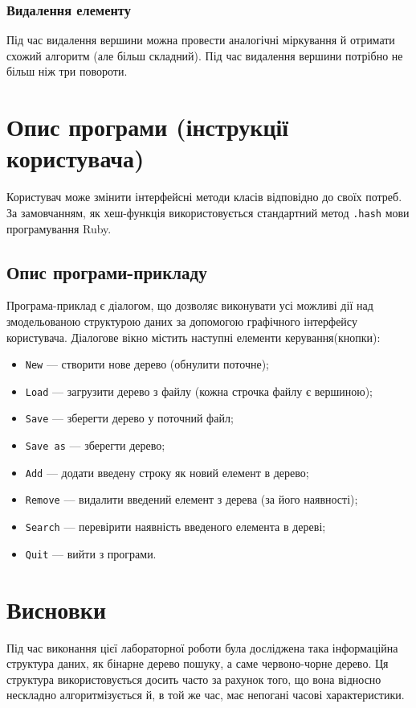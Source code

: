 \documentclass[a4paper,10pt,notitlepage,pdftex,headsepline]{scrartcl}
\begin{document}
\subsubsection{Видалення елементу}
Під час видалення вершини можна провести аналогічні міркування й отримати схожий алгоритм (але більш складний).
Під час видалення вершини потрібно не більш ніж три повороти.
\section{Опис програми (інструкції користувача)}
Користувач може змінити інтерфейсні методи класів відповідно до своїх потреб.
За замовчанням, як хеш-функція використовується стандартний метод \verb|.hash| мови програмування Ruby.

\subsection{Опис програми-прикладу}
Програма-приклад є діалогом, що дозволяє виконувати усі можливі дії над змодельованою структурою даних за допомогою графічного інтерфейсу користувача.
Діалогове вікно містить наступні елементи керування(кнопки):
\begin{itemize}
\item \texttt{New} --- створити нове дерево (обнулити поточне);
\item \texttt{Load} --- загрузити дерево з файлу (кожна строчка файлу є вершиною);
\item \texttt{Save} --- зберегти дерево у поточний файл;
\item \texttt{Save as} --- зберегти дерево;
\item \texttt{Add} --- додати введену строку як новий елемент в дерево;
\item \texttt{Remove} --- видалити введений елемент з дерева (за його наявності);
\item \texttt{Search} --- перевірити наявність введеного елемента в дереві;
\item \texttt{Quit} --- вийти з програми.
\end{itemize}
\section{Висновки}
Під час виконання цієї лабораторної роботи була досліджена така інформаційна структура даних, як бінарне дерево пошуку, а саме червоно-чорне дерево.
Ця структура використовується досить часто за рахунок того, що вона відносно нескладно алгоритмізується й, в той же час, має непогані часові характеристики.
\end{document}
